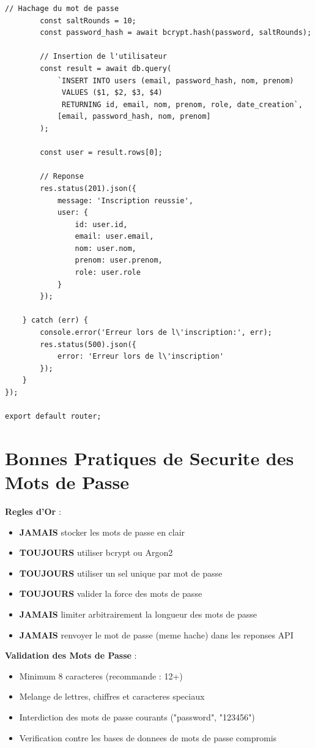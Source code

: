 \documentclass[a4paper,12pt]{book}
\begin{document}
\begin{lstlisting}[style=javascript, caption=routes/auth.js - Route d'inscription avec bcrypt]
        // Hachage du mot de passe
        const saltRounds = 10;
        const password_hash = await bcrypt.hash(password, saltRounds);

        // Insertion de l'utilisateur
        const result = await db.query(
            `INSERT INTO users (email, password_hash, nom, prenom)
             VALUES ($1, $2, $3, $4)
             RETURNING id, email, nom, prenom, role, date_creation`,
            [email, password_hash, nom, prenom]
        );

        const user = result.rows[0];

        // Reponse
        res.status(201).json({
            message: 'Inscription reussie',
            user: {
                id: user.id,
                email: user.email,
                nom: user.nom,
                prenom: user.prenom,
                role: user.role
            }
        });

    } catch (err) {
        console.error('Erreur lors de l\'inscription:', err);
        res.status(500).json({
            error: 'Erreur lors de l\'inscription'
        });
    }
});

export default router;
\end{lstlisting}

\section{Bonnes Pratiques de Securite des Mots de Passe}

\begin{bestpracticebox}
    \textbf{Regles d'Or} :
    \begin{itemize}
        \item \textbf{JAMAIS} stocker les mots de passe en clair
        \item \textbf{TOUJOURS} utiliser bcrypt ou Argon2
        \item \textbf{TOUJOURS} utiliser un sel unique par mot de passe
        \item \textbf{TOUJOURS} valider la force des mots de passe
        \item \textbf{JAMAIS} limiter arbitrairement la longueur des mots de passe
        \item \textbf{JAMAIS} renvoyer le mot de passe (meme hache) dans les reponses API
    \end{itemize}
\end{bestpracticebox}

\begin{securitybox}
    \textbf{Validation des Mots de Passe} :
    \begin{itemize}
        \item Minimum 8 caracteres (recommande : 12+)
        \item Melange de lettres, chiffres et caracteres speciaux
        \item Interdiction des mots de passe courants ("password", "123456")
        \item Verification contre les bases de donnees de mots de passe compromis
    \end{itemize}
\end{securitybox}
\end{document}
